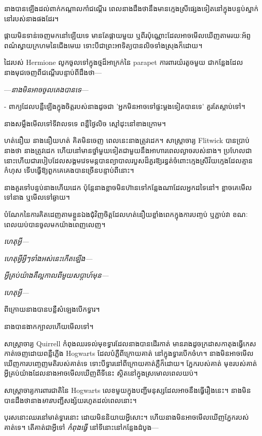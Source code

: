 {{នាង​បាន​ឡើង​ដល់​ពាក់​កណ្តាល​កាំជណ្តើរ ពេល​នាង​ដឹង​ថា​នឹង​មាន​ក្មេង​ស្រី​ផ្សេង​ទៀត​នៅ​ក្នុង​បន្ទប់​ស្នាក់​នៅ​របស់​នាង​ផង​ដែរ។

\later

ផ្កាយមិនទាន់ចេញមកនៅឡើយទេ មានតែផ្កាយមួយ ឬពីរប៉ុណ្ណោះដែលអាចមើលឃើញតាមរយៈអ័ព្ទពណ៌ស្វាយក្រហមនៃជើងមេឃ ទោះបីជាព្រះអាទិត្យបានលិចទាំងស្រុងក៏ដោយ។

ដៃរបស់ Hermione លូកចូលទៅក្នុងថ្មដ៏អាក្រក់នៃ parapet ការពារយ៉រតូចមួយ ជាកន្លែងដែលនាងមុជចេញពីជណ្ដើរបន្ទាប់ពីដឹងថា—

—\emph{នាង​មិន​អាច​ចូល​គេង​បាន​ទេ}—

- ពាក្យដែលបន្លឺឡើងក្នុងចិត្តរបស់នាងដូចជា 'អ្នកមិនអាចទៅផ្ទះម្តងទៀតបានទេ' គួរតែស្តាប់ទៅ។

នាងសម្លឹងមើលទៅទីវាលទទេ ពន្លឺថ្ងៃលិច ស្មៅដុះនៅខាងក្រោម។

ហត់នឿយ នាងនឿយហត់ គិតមិនចេញ ពេលនេះនាងត្រូវដេក។ សាស្ត្រាចារ្យ Flitwick បានប្រាប់នាងថា នាងត្រូវដេក ហើយនៅមានថ្នាំមួយទៀតជាមួយនឹងអាហារពេលល្ងាចរបស់នាង។ ប្រហែលជានោះហើយជារបៀបដែលសង្គមវេទមន្តបានព្យាបាលរបួសដ៏គួរឱ្យរន្ធត់ចំពោះក្មេងស្រីវ័យក្មេងដែលគ្មានកំហុស ទើបធ្វើឱ្យពួកគេគេងបានច្រើនបន្ទាប់ពីនោះ។

នាង​គួរ​ទៅ​បន្ទប់​នាង​ហើយ​ដេក ប៉ុន្តែ​នាង​ខ្លាច​មិន​ហ៊ាន​ទៅ​កន្លែង​ណា​ដែល​អ្នក​ដទៃ​នៅ។ ខ្លាច​គេ​មើល​ទៅ​នាង ឬ​មើល​ទៅ​ឆ្ងាយ។

បំណែក​នៃ​ការ​គិត​ដេញ​តាម​ខ្លួន​ឯង​ជុំវិញ​ចិត្ត​ដែល​ហត់នឿយ​ខ្លាំង​ពេក​ក្នុង​ការ​បញ្ចប់ ឬ​ភ្ជាប់​វា ខណៈ​ពេល​យប់​បាន​ចូល​មក​យ៉ាង​ពេញលេញ។

\emph{ហេតុអ្វី—}

\emph{ហេតុអ្វីអ្វីៗទាំងអស់នេះកើតឡើង—}

\emph{អ្វីគ្រប់យ៉ាងគឺល្អកាលពីមួយសប្តាហ៍មុន—}

\emph{ហេតុអ្វី—}

ពី​ក្រោយ​នាង​បាន​បន្លឺ​សំឡេង​បើក​ទ្វារ។

នាងបានងាកក្បាលហើយមើលទៅ។

សាស្ត្រាចារ្យ Quirrell កំពុងឈរទល់មុខទ្វារដែលនាងបានដើរកាត់ មានរាងដូចក្រដាសកាតុងធ្វើកេសកាត់ចេញដោយពន្លឺភ្លើង Hogwarts ដែលបំភ្លឺពីក្រោយគាត់ នៅក្នុងទ្វារបើកចំហ។ នាង​មិន​អាច​មើល​ឃើញ​ការ​បញ្ចេញ​មតិ​របស់​គាត់​ទេ ទោះ​បី​ទ្វារ​នៅ​ពី​ក្រោយ​គាត់​ភ្លឺ​ក៏​ដោយ។ ភ្នែករបស់គាត់ មុខរបស់គាត់ អ្វីគ្រប់យ៉ាងដែលនាងអាចមើលឃើញពីទីនេះ ស្ថិតនៅក្នុងស្រមោលពេលយប់។

សាស្ត្រាចារ្យការពារជាតិនៃ Hogwarts លេខមួយក្នុងបញ្ជីមនុស្សដែលអាចនឹងធ្វើរឿងនេះ។ នាង​មិន​បាន​ដឹង​ថា​នាង​\emph{មាន​}បញ្ជី​សង្ស័យ​រហូត​ដល់​ពេល​នោះ។

បុរសនោះឈរនៅមាត់ទ្វារនោះ ដោយមិននិយាយអ្វីសោះ។ ហើយនាងមិនអាចមើលឃើញភ្នែករបស់គាត់ទេ។ តើគាត់ជាអ្វីទៅ \emph{កំពុងធ្វើ} នៅទីនោះនៅកន្លែងដំបូង—

}}
